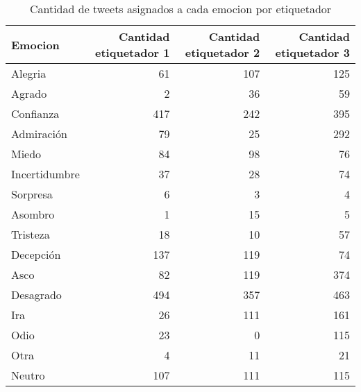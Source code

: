 \begin{table}
\centering
\scriptsize
\begin{tabular}{lrrr}
\toprule
Emocion & Cantidad etiquetador 1 & Cantidad etiquetador 2 & Cantidad etiquetador 3 \\
\midrule
Alegria & 61 & 107 & 125 \\
Agrado & 2 & 36 & 59 \\
Confianza & 417 & 242 & 395 \\
Admiración & 79 & 25 & 292 \\
Miedo & 84 & 98 & 76 \\
Incertidumbre & 37 & 28 & 74 \\
Sorpresa & 6 & 3 & 4 \\
Asombro & 1 & 15 & 5 \\
Tristeza & 18 & 10 & 57 \\
Decepción & 137 & 119 & 74 \\
Asco & 82 & 119 & 374 \\
Desagrado & 494 & 357 & 463 \\
Ira & 26 & 111 & 161 \\
Odio & 23 & 0 & 115 \\
Otra & 4 & 11 & 21 \\
Neutro & 107 & 111 & 115 \\
\bottomrule
\end{tabular}
\caption{Cantidad de tweets asignados a cada emocion por etiquetador}
\label{table:tweets_etiquetador}
\end{table}
